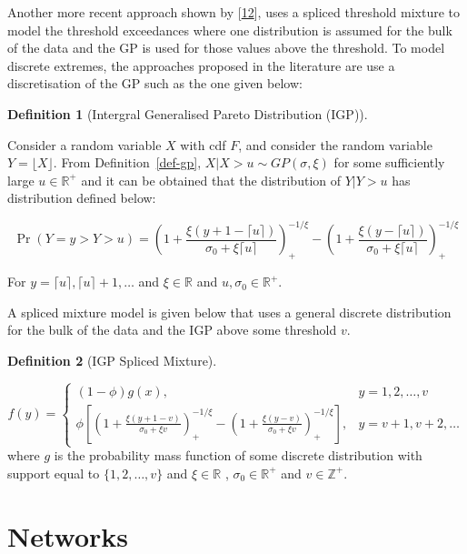 \documentclass[
  10pt,
  a4paper,
]{scrreprt}
\theoremstyle{definition}
\newtheorem{definition}{Definition}[section]
\theoremstyle{plain}
\theoremstyle{plain}
\theoremstyle{remark}
\begin{document}
{Another more recent approach shown by
{[}\protect\hyperlink{ref-mac2012}{12}{]}, uses a spliced threshold
mixture to model the threshold exceedances where one distribution is
assumed for the bulk of the data and the GP is used for those values
above the threshold. To model discrete extremes, the approaches proposed
in the literature are use a discretisation of the GP such as the one
given below:

\begin{definition}[Intergral Generalised Pareto Distribution
(IGP)]\protect\hypertarget{def-igp}{}\label{def-igp}

Consider a random variable \(X\) with cdf \(F\), and consider the random
variable \(Y=\lfloor X \rfloor\). From Definition~\ref{def-gp},
\(X|X>u \sim GP(\sigma, \xi)\) for some sufficiently large
\(u\in \mathbb R^+\) and it can be obtained that the distribution of
\(Y|Y>u\) has distribution defined below:

\[
\Pr(Y=y>Y>u) = \left(1+\displaystyle\frac{\xi(y+1-\lceil u\rceil)}{\sigma_0+\xi\lceil u\rceil}\right)_+^{-1/\xi}-\left(1+\displaystyle\frac{\xi(y-\lceil u\rceil)}{\sigma_0+\xi\lceil u\rceil}\right)_+^{-1/\xi}
\]

For \(y=\lceil u\rceil,\lceil u\rceil+1, \ldots\) and
\(\xi \in \mathbb R\) and \(u, \sigma_0 \in \mathbb R^+.\)

\end{definition}

A spliced mixture model is given below that uses a general discrete
distribution for the bulk of the data and the IGP above some threshold
\(v\).

\begin{definition}[IGP Spliced
Mixture]\protect\hypertarget{def-mixigp}{}\label{def-mixigp}

\[
f(y) = \begin{cases}
(1-\phi)g(x), & y=1,2,\ldots, v\\
\phi\left[\left(1+\displaystyle\frac{\xi(y+1-v)}{\sigma_0+\xi v}\right)_+^{-1/\xi}-\left(1+\displaystyle\frac{\xi(y-v)}{\sigma_0+\xi v}\right)_+^{-1/\xi}\right],&y=v+1, v+2,\ldots
\end{cases}
\] where \(g\) is the probability mass function of some discrete
distribution with support equal to \(\{1,2,\ldots,v\}\) and
\(\xi \in \mathbb R\) , \(\sigma_0 \in \mathbb R^+\) and
\(v\in\mathbb Z^+.\)

\end{definition}

\hypertarget{sec-net}{%
\chapter{Networks}\label{sec-net}}

}
\end{document}
